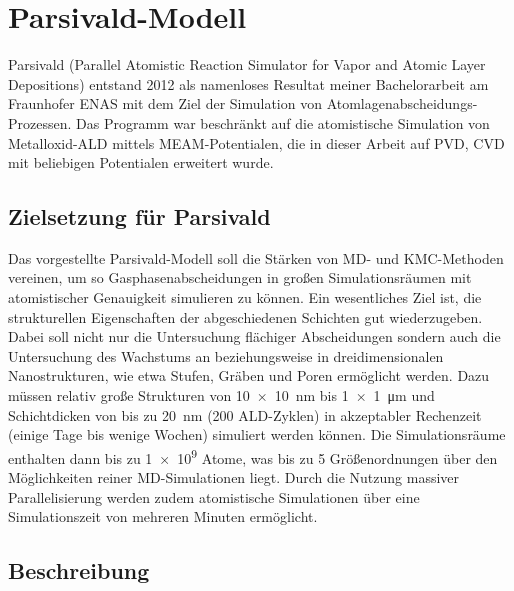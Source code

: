 \section{Parsivald-Modell}
\label{parsivald}


Parsivald (Parallel Atomistic Reaction Simulator for Vapor and Atomic Layer Depositions) entstand 2012 als namenloses Resultat meiner Bachelorarbeit\cite{lorenz_entwicklung_2012} am Fraunhofer ENAS mit dem Ziel der Simulation von Atom\-lagen\-abscheidungs-Prozessen.
Das Programm war beschränkt auf die atomistische Simulation von Metall\-oxid-ALD mittels MEAM-Potentialen, die in dieser Arbeit auf PVD, CVD mit beliebigen Potentialen erweitert wurde.

\subsection{Zielsetzung für Parsivald}

Das vorgestellte Parsivald-Modell soll die Stärken von MD- und KMC-Methoden vereinen, um so Gasphasenabscheidungen in großen Simulationsräumen mit atomistischer Genauigkeit simulieren zu können.
Ein wesentliches Ziel ist, die strukturellen Eigenschaften der abgeschiedenen Schichten gut wiederzugeben.
Dabei soll nicht nur die Untersuchung flächiger Abscheidungen sondern auch die Untersuchung des Wachstums an beziehungsweise in dreidimensionalen Nanostrukturen, wie etwa Stufen, Gräben und Poren ermöglicht werden.
Dazu müssen relativ große Strukturen von \SI{10x10}{\nano\meter} bis \SI{1x1}{\micro\meter} und Schichtdicken von bis zu \SI{20}{\nano\meter} (\num{200} ALD-Zyklen) in akzeptabler Rechenzeit (einige Tage bis wenige Wochen) simuliert werden können.
Die Simulationsräume enthalten dann bis zu \num{1e9} Atome, was bis zu \num{5} Größenordnungen über den Möglichkeiten reiner MD-Simulationen liegt.
Durch die Nutzung massiver Parallelisierung werden zudem atomistische Simulationen über eine Simulationszeit von mehreren Minuten ermöglicht.

\subsection{Beschreibung}

